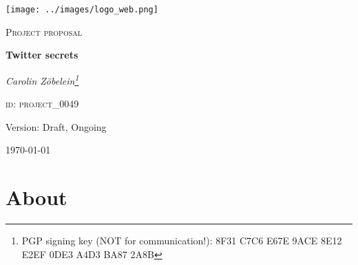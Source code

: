

\begin{titlepage}
	\begin{center}
    \begin{center}
            \texttt{[image: ../images/logo\_web.png]}
    \end{center}
    \vspace{1cm}
	{\scshape\Large Project proposal\par}
	\vspace{1.5cm}
	{\huge\bfseries Twitter secrets\par}
	\vspace{2cm}
	{\Large\itshape Carolin Z\"obelein\footnote{PGP signing key (NOT for communication!): 8F31 C7C6 E67E 9ACE 8E12 E2EF 0DE3 A4D3 BA87 2A8B}\par}
	\vfill
	\textsc{id: project\_0049}
	\vfill

	{\large Version: Draft, Ongoing\par}	%
	{\large \today\par}
	\end{center}
\end{titlepage}
\newpage
\section*{About}
\label{s:about}
\begin{comment}
\end{comment}
\newpage
